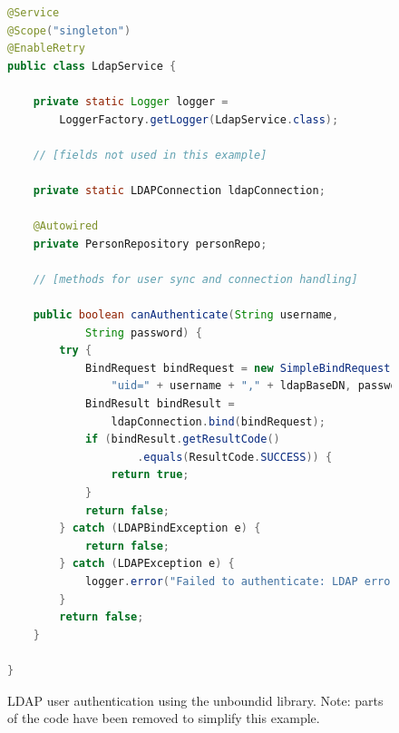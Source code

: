 \begin{figure}[H]
\begin{lstlisting}[language=Java]
@Service
@Scope("singleton")
@EnableRetry
public class LdapService {

	private static Logger logger =
		LoggerFactory.getLogger(LdapService.class);

	// [fields not used in this example]

	private static LDAPConnection ldapConnection;

	@Autowired
	private PersonRepository personRepo;

	// [methods for user sync and connection handling]

	public boolean canAuthenticate(String username,
			String password) {
		try {
			BindRequest bindRequest = new SimpleBindRequest(
				"uid=" + username + "," + ldapBaseDN, password);
			BindResult bindResult =
				ldapConnection.bind(bindRequest);
			if (bindResult.getResultCode()
					.equals(ResultCode.SUCCESS)) {
				return true;
			}
			return false;
		} catch (LDAPBindException e) {
			return false;
		} catch (LDAPException e) {
			logger.error("Failed to authenticate: LDAP error");
		}
		return false;
	}

}
\end{lstlisting}
\caption[Code: LDAP User Authentication]{LDAP user authentication using the unboundid library. Note: parts of the code have been removed to simplify this example.}
\end{figure}


